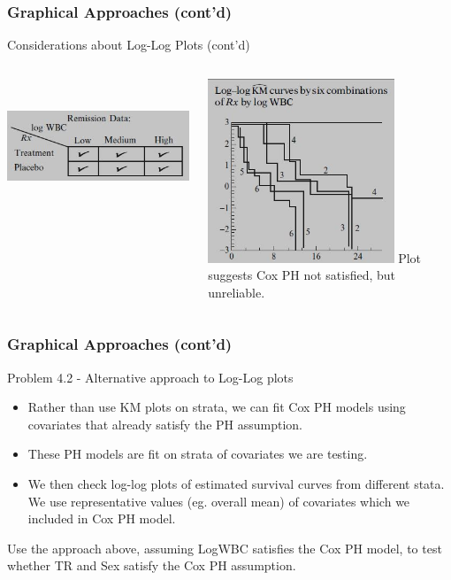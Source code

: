 \documentclass{beamer}
\theoremstyle{definition}
\begin{document}
\begin{frame}
\frametitle{Graphical Approaches (cont'd)}
\begin{block}{Considerations about Log-Log Plots (cont'd)}
\begin{columns}
    \begin{column}{0.48\textwidth}
        \includegraphics[width =\textwidth, height=4cm]{CH4_loglogMC.JPG}
    \end{column}
    \hspace{-10pt}
    \begin{column}{0.48\textwidth}
         \includegraphics[width =\textwidth, height=5.5cm]{Ch4_loglog6.JPG}
          Plot suggests Cox PH not satisfied, but unreliable.
    \end{column}
\end{columns}
\end{block}
\end{frame}

\begin{frame}
\frametitle{Graphical Approaches (cont'd)}
\begin{block}{Problem 4.2 - Alternative approach to Log-Log plots}
\begin{itemize}
\item Rather than use KM plots on strata, we can fit Cox PH models using covariates that already satisfy the PH assumption.
\item These PH models are fit on strata of covariates we are testing.
\item We then check log-log plots of estimated survival curves from different stata.  We use representative values (eg. overall mean) of covariates which we included in Cox PH model.
\end{itemize}
Use the approach above, assuming LogWBC satisfies the Cox PH model, to test whether TR and Sex satisfy the Cox PH assumption. 
\end{block}
\end{frame}
\end{document}
